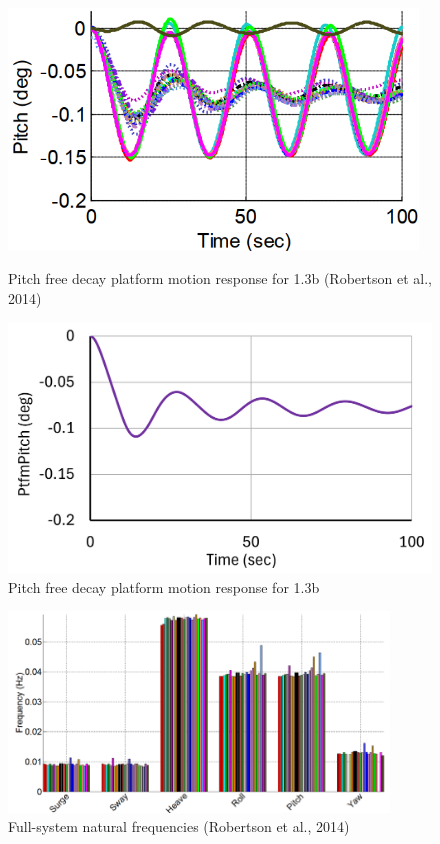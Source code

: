 \documentclass[a4paper, 11pt]{article}
\begin{document}
\begin{figure}[H]
    \begin{minipage}{0.47\textwidth}
        \centering
        \includegraphics[width=0.97\textwidth]{1.3b_pitch.png}
        \caption{\small Pitch free decay platform motion response for 1.3b (Robertson et al., 2014)}
        \label{fig:1.3b_pitch}
    \end{minipage}
    \hfill
    \begin{minipage}{0.5\textwidth}
        \centering
        \vspace{-0.3cm}
        \includegraphics[width=1\textwidth]{1.3b_pitch_mine.png}
        \caption{\small Pitch free decay platform motion response for 1.3b}
        \label{fig:1.3b_pitch_mine}
    \end{minipage}
\end{figure}


\begin{figure}[H]
    \centering
    \includegraphics[width=0.9\textwidth]{nat_freq.png}
    \caption{\small Full-system natural frequencies (Robertson et al., 2014)}
    \label{fig:nat_freq}
\end{figure}
\end{document}
